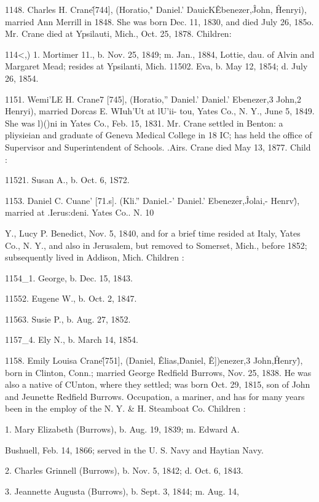 \documentclass{book}
\begin{document}
1148. Charles H. Crane\^ [744], (Horatio," Daniel.' DauicK\^ 
Ebenezer,\^ John, \^ Henryi), married Ann Merrill in 1848. She 
was born Dec. 11, 1830, and died July 26, 185o. Mr. Crane 
died at Ypsilauti, Mich., Oct. 25, 1878. Children: 

114<,) 1. Mortimer 11., b. Nov. 25, 1849; m. Jan., 1884, Lottie, dau. 
of Alvin and Margaret Mead; resides at Ypsilanti, Mich. 
11502. Eva, b. May 12, 1854; d. July 26, 1854. 

1151. Wemi'LE H. Crane7 [745], (Horatio,'' Daniel.' Daniel.' 
Ebenezer,3 John,2 Henryi), married Dorcas E. WIuh'Ut at lU'ii- 
tou, Yates Co., N. Y., June 5, 1849. She was l)()ni in Yates 
Co., Feb. 15, 1831. Mr. Crane settled in Benton: a pliysieian 
and graduate of Geneva Medical College in 18 IC; has held the 
office of Supervisor and Superintendent of Schools. .Airs. Crane 
died May 13, 1877. Child : 

11521. Susan A., b. Oct. 6, 1S72. 

1153. Daniel C. Cuane' [71.s]. (Kli.'' Daniel.-' Daniel.' 
Ebenezer,\^ Jolai,- Henrv\^), married at .Ierus:deni. Yates Co.. N. 
10 




Y., Lucy P. Benedict, Nov. 5, 1840, and for a brief time resided 
at Italy, Yates Co., N. Y., and also in Jerusalem, but removed 
to Somerset, Mich., before 1852; subsequently lived in Addison, 
Mich. Children : 

1154\_1. George, b. Dec. 15, 1843. 

11552. Eugene W., b. Oct. 2, 1847. 

11563. Susie P., b. Aug. 27, 1852. 

1157\_4. Ely N., b. March 14, 1854. 

1158. Emily Louisa Crane\^ [751], (Daniel, \^ Elias,\^ Daniel, \^ 
E])enezer,3 John,\^ Henry\^), born in Clinton, Conn.; married 
George Redfield Burrows, Nov. 25, 1838. He was also a native 
of CUnton, where they settled; was born Oct. 29, 1815, son of 
John and Jeunette Redfield Burrows. Occupation, a mariner, 
and has for many years been in the employ of the N. Y. \& H. 
Steamboat Co. Children : 

1. Mary Elizabeth (Burrows), b. Aug. 19, 1839; m. Edward A. 

Bushuell, Feb. 14, 1866; served in the U. S. Navy and Haytian 
Navy. 

2. Charles Grinnell (Burrows), b. Nov. 5, 1842; d. Oct. 6, 1843. 

3. Jeannette Augusta (Burrows), b. Sept. 3, 1844; m. Aug. 14, 
\end{document}
